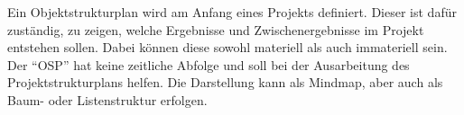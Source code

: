Ein Objektstrukturplan wird am Anfang eines Projekts definiert. Dieser ist dafür zuständig, zu zeigen, welche Ergebnisse und Zwischenergebnisse im Projekt entstehen sollen. Dabei können diese sowohl materiell als auch immateriell sein. Der \enquote{OSP} hat keine zeitliche Abfolge und soll bei der Ausarbeitung des Projektstrukturplans helfen. Die Darstellung kann als Mindmap, aber auch als Baum- oder Listenstruktur erfolgen.